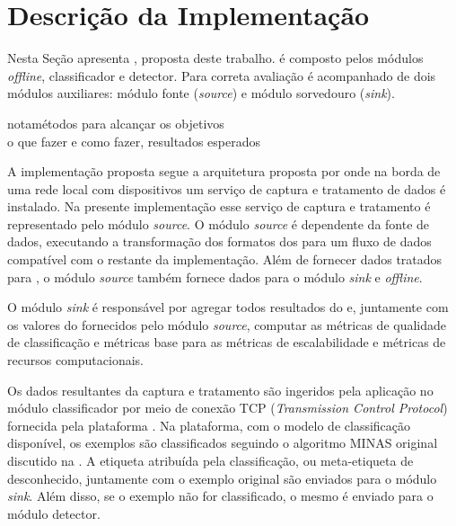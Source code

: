 

\section{Descrição da Implementação}\label{sec:descricao}

\newcommand{\source}{\emph{source}\xspace}
\newcommand{\sink}{\emph{sink}\xspace}

\newcommand{\offline}{\emph{offline}\xspace}
\newcommand{\classify}{classificador\xspace}
\newcommand{\detector}{detector\xspace}

Nesta Seção apresenta \mfog, proposta deste trabalho.
\mfog é composto pelos módulos \offline, \classify e \detector.
Para correta avaliação \mfog é acompanhado de dois módulos auxiliares:
módulo fonte (\source) e módulo sorvedouro (\sink).

nota{métodos para alcançar os objetivos \\
o que fazer e como fazer, resultados esperados}

A implementação proposta segue a arquitetura proposta por
 onde na borda de uma rede local com dispositivos \iot
um serviço de captura e tratamento de dados é instalado.
Na presente implementação esse serviço de captura e tratamento é representado
pelo módulo \source.
O módulo \source é dependente da fonte de dados, executando a transformação dos
formatos dos \datasets para um fluxo de dados compatível com o restante da
implementação.
Além de fornecer dados tratados para \mfog, o módulo \source também fornece
dados para o módulo \sink e \offline.

O módulo \sink é responsável por agregar todos resultados do \mfog e, juntamente
com os valores do \dataset fornecidos pelo módulo \source, computar as métricas
de qualidade de classificação e métricas base para as métricas de
escalabilidade e métricas de recursos computacionais.

Os dados resultantes da captura e tratamento são ingeridos pela aplicação no
módulo \classify por meio de conexão TCP (\emph{Transmission Control Protocol})
fornecida pela plataforma \flink.
Na plataforma, com o modelo de classificação disponível, os exemplos são
classificados seguindo o algoritmo MINAS original discutido na .
A etiqueta atribuída pela classificação, ou meta-etiqueta de desconhecido,
juntamente com o exemplo original são enviados para o módulo \sink.
Além disso, se o exemplo não for classificado, o mesmo é enviado para o módulo
\detector.

